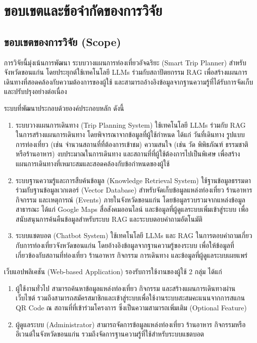 \section{ขอบเขตและข้อจำกัดของการวิจัย}

\subsection{ขอบเขตของการวิจัย (Scope)}

การวิจัยนี้มุ่งเน้นการพัฒนา ระบบวางแผนการท่องเที่ยวอัจฉริยะ (Smart Trip Planner) สำหรับจังหวัดขอนแก่น โดยประยุกต์ใช้เทคโนโลยี LLMs ร่วมกับสถาปัตยกรรม RAG เพื่อสร้างแผนการเดินทางที่สอดคล้องกับความต้องการของผู้ใช้ และสามารถอ้างอิงข้อมูลจากฐานความรู้ที่ได้รับการจัดเก็บและปรับปรุงอย่างต่อเนื่อง

ระบบที่พัฒนาประกอบด้วยองค์ประกอบหลัก ดังนี้

\begin{enumerate}[leftmargin=1.8cm]
\item ระบบวางแผนการเดินทาง (Trip Planning System) ใช้เทคโนโลยี LLMs ร่วมกับ RAG ในการสร้างแผนการเดินทาง โดยพิจารณาจากข้อมูลที่ผู้ใช้กำหนด ได้แก่ วันที่เดินทาง รูปแบบการท่องเที่ยว (เช่น จำนวนสถานที่ที่ต้องการเข้าชม) ความสนใจ (เช่น วัด พิพิธภัณฑ์ ธรรมชาติ หรือร้านอาหาร) งบประมาณในการเดินทาง และสถานที่ที่ผู้ใช้ต้องการไปเป็นพิเศษ เพื่อสร้างแผนการเดินทางที่เหมาะสมและสอดคล้องกับข้อกำหนดของผู้ใช้
\item ระบบฐานความรู้และการสืบค้นข้อมูล (Knowledge Retrieval System) ใช้ฐานข้อมูลธรรมดา ร่วมกับฐานข้อมูลเวกเตอร์ (Vector Database) สำหรับจัดเก็บข้อมูลแหล่งท่องเที่ยว ร้านอาหาร กิจกรรม และเหตุการณ์ (Events) ภายในจังหวัดขอนแก่น โดยข้อมูลรวบรวมจากแหล่งข้อมูลสาธารณะ ได้แก่ Google Maps สื่อสังคมออนไลน์ และข้อมูลที่ผู้ดูแลระบบเพิ่มเข้าสู่ระบบ เพื่อสนับสนุนการค้นคืนข้อมูลสำหรับระบบ RAG และระบบตอบคำถามอัตโนมัติ
\item ระบบแชตบอต (Chatbot System) ใช้เทคโนโลยี LLMs และ RAG ในการตอบคำถามเกี่ยวกับการท่องเที่ยวจังหวัดขอนแก่น โดยอ้างอิงข้อมูลจากฐานความรู้ของระบบ เพื่อให้ข้อมูลที่เกี่ยวข้องกับสถานที่ท่องเที่ยว ร้านอาหาร กิจกรรม การเดินทาง และข้อมูลที่ผู้ดูแลระบบเผยแพร่
\end{enumerate}

เว็บแอปพลิเคชัน (Web-based Application) รองรับการใช้งานของผู้ใช้ 2 กลุ่ม ได้แก่

\begin{enumerate}[leftmargin=1.8cm]
\item ผู้ใช้งานทั่วไป สามารถค้นหาข้อมูลแหล่งท่องเที่ยว กิจกรรม และสร้างแผนการเดินทางผ่านเว็บไซต์ รวมถึงสามารถสมัครสมาชิกและเข้าสู่ระบบเพื่อใช้งานระบบสะสมคะแนนจากการสแกน QR Code ณ สถานที่ที่เข้าร่วมโครงการ ซึ่งเป็นความสามารถเพิ่มเติม (Optional Feature)
\item ผู้ดูแลระบบ (Administrator) สามารถจัดการข้อมูลแหล่งท่องเที่ยว ร้านอาหาร กิจกรรมหรืออีเวนต์ในจังหวัดขอนแก่น รวมถึงจัดการฐานความรู้ที่ใช้สำหรับระบบแชตบอต
\end{enumerate}

